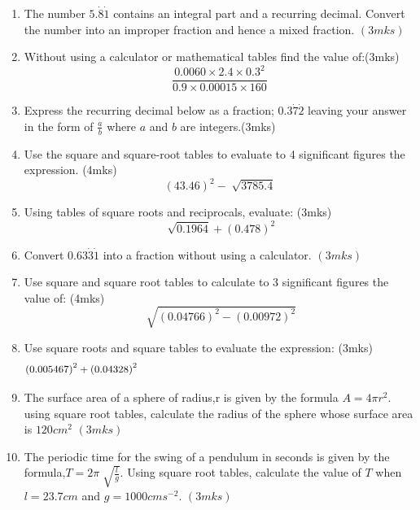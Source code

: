 \documentclass[
  a4paperpaper,
]{scrbook}
\begin{document}
\begin{tcolorbox}
\begin{enumerate}
\def\labelenumi{\arabic{enumi}.}
\setcounter{enumi}{5}
\item
  The number \(5.\dot{8}\dot{1}\) contains an integral part and a
  recurring decimal. Convert the number into an improper fraction and
  hence a mixed fraction.\hspace{7cm} \((3mks)\)
\item
  Without using a calculator or mathematical tables find the value
  of:(3mks) \[
  \frac{0.0060\times2.4\times0.3^2}{0.9\times0.00015\times160} 
  \]
\item
  Express the recurring decimal below as a fraction;
  \(0.3\dot{7}\dot{2}\) leaving your answer in the form of
  \(\frac{a}{b}\) where \(a\) and \(b\) are integers.(3mks)
\item
  Use the square and square-root tables to evaluate to 4 significant
  figures the expression. (4mks) \[
  \left(43.46\right)^2-\sqrt[]{3785.4}
  \]
\item
  Using tables of square roots and reciprocals, evaluate: (3mks) \[
  \sqrt[]{0.1964}+(0.478)^2
  \]
\item
  Convert \(0.63\dot{3}\dot{1}\) into a fraction without using a
  calculator. \hspace{4.75cm} \((3mks)\)
\item
  Use square and square root tables to calculate to 3 significant
  figures the value of: (4mks) \[
  \sqrt[]{\left(0.04766\right)^2-(0.00972)^2}  
  \]
\item
  Use square roots and square tables to evaluate the expression: (3mks)
  \[
  \left(0.005467\right)^2+\left(0.04328\right)^2 \hspace{9.95cm} 
  \]
\item
  The surface area of a sphere of radius,r is given by the formula
  \(A = 4\pi r^2\). using square root tables, calculate the radius of
  the sphere whose surface area is \(120 cm^2\) \hspace{3.2cm}
  \((3mks)\)
\item
  The periodic time for the swing of a pendulum in seconds is given by
  the formula,\(T =2\pi\sqrt[]{\frac{l}{g}}\). Using square root tables,
  calculate the value of \(T\) when \(l = 23.7cm\) and
  \(g = 1000 cms^{-2}\). \hspace*{14.2cm} \((3mks)\)
\end{enumerate}

\end{tcolorbox}

\end{document}

